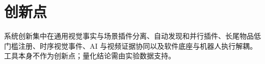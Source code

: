 \section{创新点}

系统创新集中在通用视觉事实与场景插件分离、自动发现和并行插件、长尾物品低门槛注册、时序视觉事件、AI 与视频证据协同以及软件底座与机器人执行解耦。工具本身不作为创新点；量化结论需由实验数据支持。
